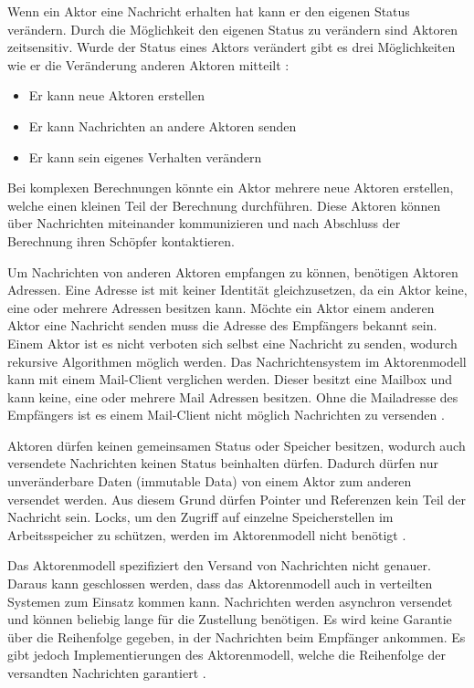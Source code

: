 Wenn ein Aktor eine Nachricht erhalten hat kann er den eigenen Status verändern. Durch die Möglichkeit den eigenen Status zu verändern sind Aktoren zeitsensitiv. Wurde der Status eines Aktors verändert gibt es drei Möglichkeiten wie er die Veränderung anderen Aktoren mitteilt \cite[p. 84]{Erb2012}:

\begin{itemize}
  \item Er kann neue Aktoren erstellen
  \item Er kann Nachrichten an andere Aktoren senden
  \item Er kann sein eigenes Verhalten verändern
\end{itemize}

Bei komplexen Berechnungen könnte ein Aktor mehrere neue Aktoren erstellen, welche einen kleinen Teil der Berechnung durchführen. Diese Aktoren können über Nachrichten miteinander kommunizieren und nach Abschluss der Berechnung ihren Schöpfer kontaktieren. 

Um Nachrichten von anderen Aktoren empfangen zu können, benötigen Aktoren Adressen. Eine Adresse ist mit keiner Identität gleichzusetzen, da ein Aktor keine, eine oder mehrere Adressen besitzen kann. Möchte ein Aktor einem anderen Aktor eine Nachricht senden muss die Adresse des Empfängers bekannt sein. Einem Aktor ist es nicht verboten sich selbst eine Nachricht zu senden, wodurch rekursive Algorithmen möglich werden. Das Nachrichtensystem im Aktorenmodell kann mit einem Mail-Client verglichen werden. Dieser besitzt eine Mailbox und kann keine, eine oder mehrere Mail Adressen besitzen. Ohne die Mailadresse des Empfängers ist es einem Mail-Client nicht möglich Nachrichten zu versenden \cite[p. 85]{Erb2012}. 

Aktoren dürfen keinen gemeinsamen Status oder Speicher besitzen, wodurch auch versendete Nachrichten keinen Status beinhalten dürfen. Dadurch dürfen nur unveränderbare Daten (immutable Data) von einem Aktor zum anderen versendet werden. Aus diesem Grund dürfen Pointer und Referenzen kein Teil der Nachricht sein. Locks, um den Zugriff auf einzelne Speicherstellen im Arbeitsspeicher zu schützen, werden im Aktorenmodell nicht benötigt \cite[p. 85]{Erb2012}.

Das Aktorenmodell spezifiziert den Versand von Nachrichten nicht genauer. Daraus kann geschlossen werden, dass das Aktorenmodell auch in verteilten Systemen zum Einsatz kommen kann. Nachrichten werden asynchron versendet und können beliebig lange für die Zustellung benötigen. Es wird keine Garantie über die Reihenfolge gegeben, in der Nachrichten beim Empfänger ankommen. Es gibt jedoch Implementierungen des Aktorenmodell, welche die Reihenfolge der versandten Nachrichten garantiert \cite[p. 85]{Erb2012}.

